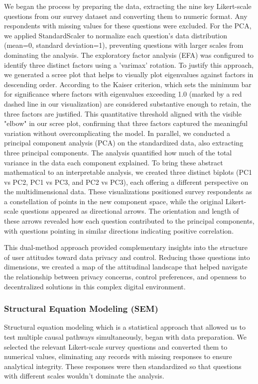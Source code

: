 	We began the process by preparing the data, extracting the nine key Likert-scale questions from our survey dataset and converting them to numeric format. Any respondents with missing values for these questions were excluded. For the PCA, we applied StandardScaler to normalize each question's data distribution (mean=0, standard deviation=1), preventing questions with larger scales from dominating the analysis. 
	The exploratory factor analysis (EFA) was configured to identify three distinct factors using a 'varimax' rotation. To justify this approach, we generated a scree plot that helps to visually plot eigenvalues against factors in descending order. According to the Kaiser criterion, which sets the minimum bar for significance where factors with eigenvalues exceeding 1.0 (marked by a red dashed line in our visualization) are considered substantive enough to retain, the three factors are justified. This quantitative threshold aligned with the visible "elbow" in our scree plot, confirming that three factors captured the meaningful variation without overcomplicating the model.	
	In parallel, we conducted a principal component analysis (PCA) on the standardized data, also extracting three principal components. The analysis quantified how much of the total variance in the data each component explained. To bring these abstract mathematical to an interpretable analysis, we created three distinct biplots (PC1 vs PC2, PC1 vs PC3, and PC2 vs PC3), each offering a different perspective on the multidimensional data. These visualizations positioned survey respondents as a constellation of points in the new component space, while the original Likert-scale questions appeared as directional arrows. The orientation and length of these arrows revealed how each question contributed to the principal components, with questions pointing in similar directions indicating positive correlation.

	This dual-method approach provided complementary insights into the structure of user attitudes toward data privacy and control. Reducing those questions into dimensions, we created a map of the attitudinal landscape that helped navigate the relationship between privacy concerns, control preferences, and openness to decentralized solutions in this complex digital environment.
	\subsubsection{Structural Equation Modeling (SEM)}
	Structural equation modeling which is a statistical approach that allowed us to test multiple causal pathways simultaneously, began with data preparation. We selected the relevant Likert-scale survey questions and converted them to numerical values, eliminating any records with missing responses to ensure analytical integrity. These responses were then standardized so that questions with different scales wouldn't dominate the analysis.
	
